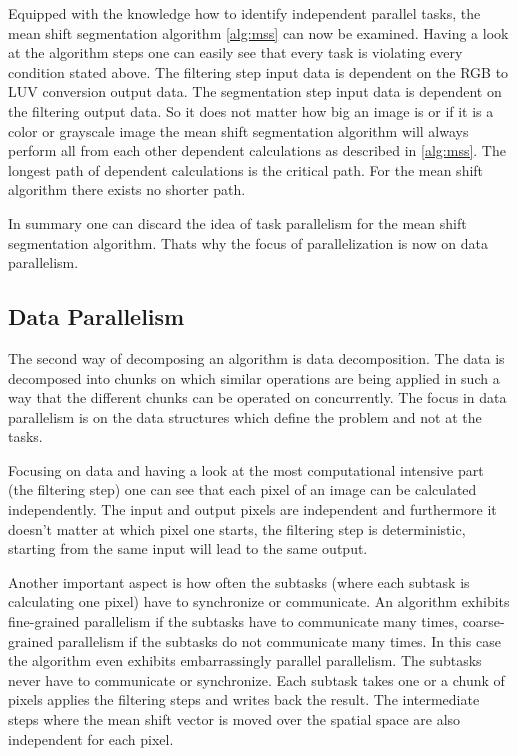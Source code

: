 Equipped with the knowledge how to identify independent parallel tasks, the mean
shift segmentation algorithm \autoref{alg:mss} can now be examined. Having a
look at the algorithm steps one can easily see that every task is violating
every condition stated above. The filtering step input data is dependent on the
\gls{RGB} to \gls{LUV} conversion output data. The segmentation step input data
is dependent on the filtering output data. So it does not matter how big an
image is or if it is a color or grayscale image the mean shift segmentation
algorithm will always perform all from each other dependent calculations as
described in \autoref{alg:mss}. The longest path of dependent calculations is
the critical path. For the mean shift algorithm there exists no shorter path.

In summary one can discard the idea of task parallelism for the mean shift
segmentation algorithm. Thats why the focus of parallelization is now on data
parallelism. 


\subsection{Data Parallelism} %
\label{sub:data_parallelism}
The second way of decomposing an algorithm is data decomposition. The data is
decomposed into chunks on which similar operations are being applied in such a
way that the different chunks can be operated on concurrently. The focus in data
parallelism is on the data structures which define the problem and not at the
tasks.

Focusing on data and having a look at the most computational intensive part (the
filtering step) one can see that each pixel of an image can be calculated
independently. The input and output pixels are independent and furthermore it
doesn't matter at which pixel one starts, the filtering step is deterministic,
starting from the same input will lead to the same output.

Another important aspect is how often the subtasks (where each subtask is
calculating one pixel) have to synchronize or communicate. An algorithm exhibits
fine-grained parallelism if the subtasks have to communicate many times,
coarse-grained parallelism if the subtasks do not communicate many times. In
this case the algorithm even exhibits embarrassingly parallel parallelism. The
subtasks never have to communicate or synchronize. Each subtask takes one or a
chunk of pixels applies the filtering steps and writes back the result. The
intermediate steps where the mean shift vector is moved over the spatial space
are also independent for each pixel.

